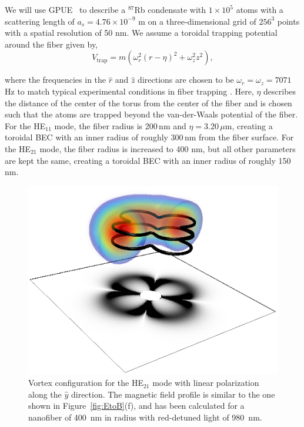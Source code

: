 We will use GPUE~\cite{schloss2018} to describe a $^{87}$Rb condensate with $1\times10^5$ atoms with a scattering length of $a_s=4.76 \times 10^{-9}$ m on a three-dimensional grid of $256^3$ points with a spatial resolution of 50 nm.
We assume a toroidal trapping potential around the fiber given by,
\begin{equation}
V_\text{trap} = m(\omega_r^2(r-\eta)^2 + \omega_z^2z^2),
\label{eqn:potential}
\end{equation}

\noindent where the frequencies in the $\hat r$ and $\hat z$ directions are chosen to be $\omega_r = \omega_z = 7071$Hz to match typical experimental conditions in fiber trapping \cite{vetsch2010}.
Here, $\eta$ describes the distance of the center of the torus from the center of the fiber and is chosen such that the atoms are trapped beyond the van-der-Waals potential of the fiber.
For the HE$_{11}$ mode, the fiber radius is 200\,nm and $\eta = 3.20$\,$\mu$m, creating a toroidal BEC with an inner radius of roughly 300\,nm from the fiber surface.
For the HE$_{21}$ mode, the fiber radius is increased to 400 nm, but all other parameters are kept the same, creating a toroidal BEC with an inner radius of roughly 150 nm.

\begin{figure}[tb]
\center \includegraphics[width=0.5\linewidth]{data/3d/HE21_3d.png}
 
 \caption{Vortex configuration for the HE$_{21}$ mode with linear polarization along the $\hat y$ direction.
\label{eqn:potential}
The magnetic field profile is similar to the one shown in Figure~\ref{fig:EtoB}(f), and has been calculated for a nanofiber of 400~nm in radius with red-detuned light of 980~nm.}
 \label{fig:HE21_3d}
\end{figure}

